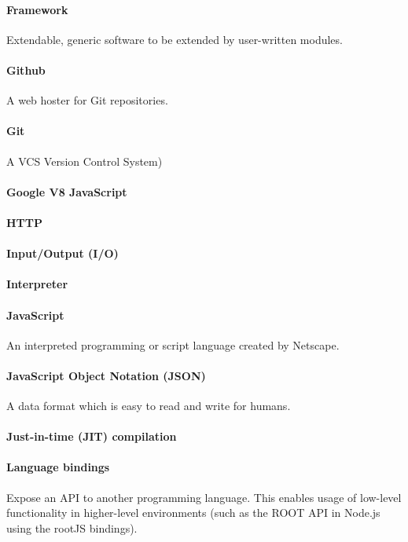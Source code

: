 \paragraph{Framework}
Extendable, generic software to be extended by user-written modules.

\paragraph{Github}
A web hoster for Git repositories.

\paragraph{Git}
A VCS  Version Control System)

\paragraph{Google V8 JavaScript}
\paragraph{HTTP}
\paragraph{Input/Output (I/O)}
\paragraph{Interpreter}
\paragraph{JavaScript}
An interpreted programming or script language created by Netscape.
\paragraph{JavaScript Object Notation (JSON)}
A data format which is easy to read and write for humans.
\paragraph{Just-in-time (JIT) compilation}
\paragraph{Language bindings}
Expose an API to another programming language. This enables usage of low-level functionality in higher-level environments (such as the ROOT API in Node.js using the rootJS bindings).
